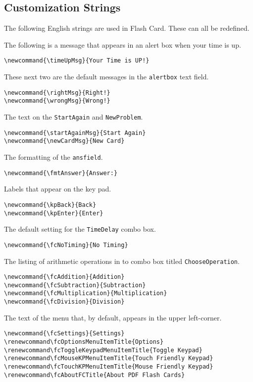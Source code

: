 \documentclass{article}
\newcommand{\sprodName}{\textsf{Flash Card}}
\begin{document}
\subsection{Customization Strings}\label{s:CusStrs}

The following English strings are used in {\sprodName}. These can all be redefined.

\newtopic\noindent The following is a message that appears in an alert box when your time is up.
\begin{Verbatim}[xleftmargin=\amtIndent]
\newcommand{\timeUpMsg}{Your Time is UP!}
\end{Verbatim}
These next two are the default messages in the \texttt{alertbox} text field.
\begin{Verbatim}[xleftmargin=\amtIndent]
\newcommand{\rightMsg}{Right!}
\newcommand{\wrongMsg}{Wrong!}
\end{Verbatim}
The text on the \texttt{StartAgain} and \texttt{NewProblem}.
\begin{Verbatim}[xleftmargin=\amtIndent]
\newcommand{\startAgainMsg}{Start Again}
\newcommand{\newCardMsg}{New Card}
\end{Verbatim}
The formatting of the \texttt{ansfield}.
\begin{Verbatim}[xleftmargin=\amtIndent]
\newcommand{\fmtAnswer}{Answer:}
\end{Verbatim}
Labels that appear on the key pad.
\begin{Verbatim}[xleftmargin=\amtIndent]
\newcommand{\kpBack}{Back}
\newcommand{\kpEnter}{Enter}
\end{Verbatim}
The default setting for the \texttt{TimeDelay} combo box.
\begin{Verbatim}[xleftmargin=\amtIndent]
\newcommand{\fcNoTiming}{No Timing}
\end{Verbatim}
The listing of arithmetic operations in to combo box titled \texttt{ChooseOperation}.
\begin{Verbatim}[xleftmargin=\amtIndent]
\newcommand{\fcAddition}{Addition}
\newcommand{\fcSubtraction}{Subtraction}
\newcommand{\fcMultiplication}{Multiplication}
\newcommand{\fcDivision}{Division}
\end{Verbatim}
The text of the menu that, by default, appears in the upper left-corner.
\begin{Verbatim}[xleftmargin=\amtIndent]
\newcommand{\fcSettings}{Settings}
\renewcommand\fcOptionsMenuItemTitle{Options}
\renewcommand\fcToggleKeypadMenuItemTitle{Toggle Keypad}
\renewcommand\fcMouseKPMenuItemTitle{Touch Friendly Keypad}
\renewcommand\fcTouchKPMenuItemTitle{Mouse Friendly Keypad}
\renewcommand\fcAboutFCTitle{About PDF Flash Cards}
\end{Verbatim}
\end{document}
